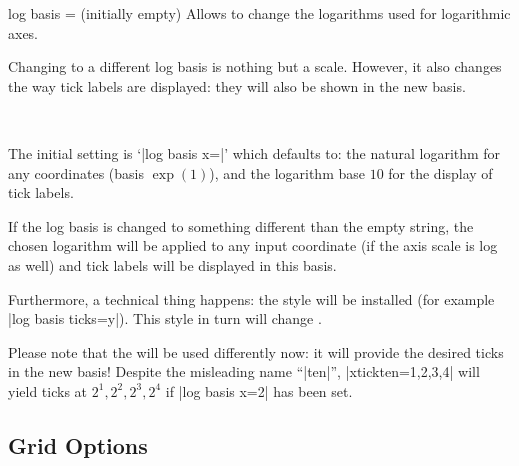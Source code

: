 \begin{pgfplotsxykey}{log basis \x= (initially empty)}
	Allows to change the logarithms used for logarithmic axes.

	Changing to a different log basis is nothing but a scale. However, it also changes the way tick labels are displayed: they will also be shown in the new basis.

\begin{codeexample}[]
~
\end{codeexample}
	
	The initial setting is `|log basis x=|' which defaults to: the natural logarithm for any coordinates (basis $\exp(1)$), and the logarithm base $10$ for the display of tick labels.

	If the log basis is changed to something different than the empty string, the chosen logarithm will be applied to any input coordinate (if the axis scale is log as well) and tick labels will be displayed in this basis. 
	
	Furthermore, a technical thing happens: the style  will be installed (for example |log basis ticks=y|). This style in turn will change .

	Please note that the  will be used differently now: it will provide the desired ticks in the new basis! Despite the misleading name ``|ten|'', |xtickten={1,2,3,4}| will yield ticks at $2^1,2^2,2^3,2^4$ if |log basis x=2| has been set.
\end{pgfplotsxykey}

\subsection{Grid Options}
	

